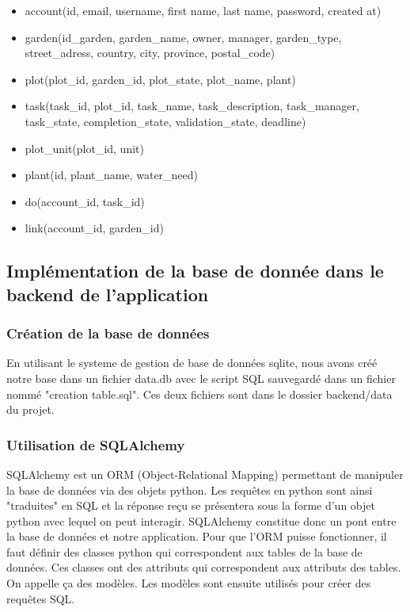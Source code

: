 \documentclass[french,a4paper]{article}
\begin{document}
\begin{itemize}
    \item account(id, email, username, first name, last name, password, created at)
    \item garden(id\_garden, garden\_name, owner, manager, garden\_type, street\_adress, country, city, province, postal\_code)
    \item plot(plot\_id, garden\_id, plot\_state, plot\_name, plant)
    \item task(task\_id, plot\_id, task\_name, task\_description, task\_manager, task\_state, completion\_state, validation\_state, deadline)
    \item plot\_unit(plot\_id, unit)
    \item plant(id, plant\_name, water\_need)
    \item do(account\_id, task\_id)
    \item link(account\_id, garden\_id)
\end{itemize}
\subsection{Implémentation de la base de donnée dans le backend de l'application}

\subsubsection{Création de la base de données}
En utilisant le systeme de gestion de base de données sqlite, nous avons créé notre base dans un fichier data.db avec le script
SQL sauvegardé dans un fichier nommé "creation table.sql". Ces deux fichiers sont dans le dossier backend/data du projet.


\subsubsection{Utilisation de SQLAlchemy}
SQLAlchemy est un ORM (Object-Relational Mapping) permettant de manipuler la base de données via des objets python. Les requêtes en
python sont ainsi "traduites" en SQL et la réponse reçu se présentera sous la forme d’un objet python avec lequel on peut interagir.
SQLAlchemy constitue donc un pont entre la base de données et notre application. Pour que l’ORM puisse fonctionner, il faut définir
des classes python qui correspondent aux tables de la base de données. Ces classes ont des attributs qui correspondent aux attributs
des tables. On appelle ça des modèles. Les modèles sont ensuite utilisés pour créer des requêtes SQL.
\end{document}
